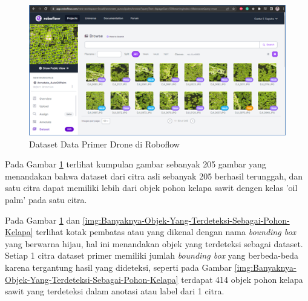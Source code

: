 \begin{figure}[H]
	\vspace{-0.1cm}
	\begin{center}
		\includegraphics[width=1\columnwidth]{bab4/Gambar/Picture20.png}
	\end{center}
	\vspace{-0.2cm}
	\captionsetup{justification=centering}
	\caption{Dataset Data Primer Drone di Roboflow}\label{img:Dataset-Data-Primer-Drone-di-Roboflow}
\end{figure}

Pada Gambar \ref{img:Dataset-Data-Primer-Drone-di-Roboflow} terlihat kumpulan gambar sebanyak 205 gambar yang menandakan bahwa dataset dari citra asli sebanyak 205 berhasil terunggah, dan satu citra dapat memiliki lebih dari objek pohon kelapa sawit dengen kelas 'oil palm' pada satu citra. 

Pada Gambar \ref{img:Dataset-Data-Primer-Drone-di-Roboflow} dan \ref{img:Banyaknya-Objek-Yang-Terdeteksi-Sebagai-Pohon-Kelapa} terlihat kotak pembatas atau yang dikenal dengan nama \textit{bounding box} yang berwarna hijau, hal ini menandakan objek yang terdeteksi sebagai dataset. Setiap 1 citra dataset primer memiliki jumlah \textit{bounding box} yang berbeda-beda karena tergantung hasil yang dideteksi, seperti pada Gambar \ref{img:Banyaknya-Objek-Yang-Terdeteksi-Sebagai-Pohon-Kelapa} terdapat 414 objek pohon kelapa sawit yang terdeteksi dalam anotasi atau label dari 1 citra. 

